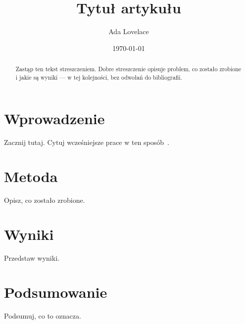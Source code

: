\documentclass[a4paper,11pt]{mwart}
\title{Tytuł artykułu}
\author{Ada Lovelace}
\date{\today}
\begin{document}
\maketitle

\begin{abstract}
Zastąp ten tekst streszczeniem. Dobre streszczenie opisuje problem, co
zostało zrobione i jakie są wyniki --- w tej kolejności, bez odwołań do
bibliografii.
\end{abstract}

\section{Wprowadzenie}
Zacznij tutaj. Cytuj wcześniejsze prace w ten sposób~\cite{knuth1984texbook}.

\section{Metoda}
\label{sec:metoda}
Opisz, co zostało zrobione.

\section{Wyniki}
\label{sec:wyniki}
Przedstaw wyniki.

\section{Podsumowanie}
Podsumuj, co to oznacza.



\end{document}
